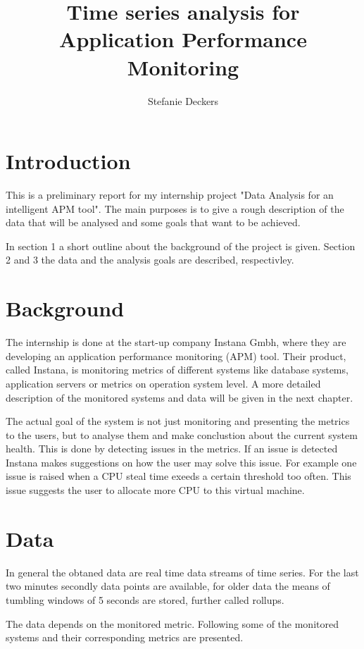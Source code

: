 \documentclass[]{article}
\title{Time series analysis for Application Performance Monitoring}
\author{Stefanie Deckers}
\begin{document}
\maketitle

\section{Introduction}
This is a preliminary report for my internship project "Data Analysis for an intelligent APM tool".
The main purposes is to give a rough description of the data that will be analysed and some goals that want to be achieved.

In section 1 a short outline about the background of the project is given.
Section 2 and 3 the data and the analysis goals are described, respectivley.

\section{Background}
The internship is done at the start-up company Instana Gmbh, where they are developing an application performance monitoring (APM) tool.
Their product, called Instana, is monitoring metrics of different systems like database systems, application servers or metrics on operation system level.
A more detailed description of the monitored systems and data will be given in the next chapter.

The actual goal of the system is not just monitoring and presenting the metrics to the users, but to analyse them and make conclustion about the current system health.
This is done by detecting issues in the metrics.
If an issue is detected Instana makes suggestions on how the user may solve this issue.
For example one issue is raised when a CPU steal time exeeds a certain threshold too often.
This issue suggests the user to allocate more CPU to this virtual machine.



\section{Data}
In general the obtaned data are real time data streams of time series.
For the last two minutes secondly data points are available, for older data the means of tumbling windows of 5 seconds are stored, further called rollups.

The data depends on the monitored metric.
Following some of the monitored systems and their corresponding metrics are presented.
\end{document}
